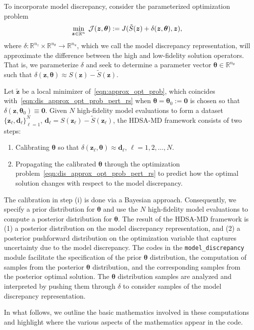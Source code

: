 \documentclass[11pt]{article}
\renewcommand{\vec}[1] {\boldsymbol{#1}}
\newcommand{\R}{\mathbb{R}}
\renewcommand{\t}{\bm{\theta}}
\newcommand{\z}{\bm{z}}
\newcommand{\0}{\bm{0}}
\renewcommand{\d}{\delta}
\begin{document}
To incorporate model discrepancy, consider the parameterized optimization problem
\begin{align}
\label{eqn:dis_approx_opt_prob_pert_rs}
 \min_{\z \in \R^n} \hspace{1 mm} \mathcal{J}(\z,\t):=J(\tilde{S}(\z)+\d(\z,\t),\z) ,
\end{align}
where $\d:\R^{n_z} \times \R^{n_\theta} \to \R^{n_u}$, which we call the model discrepancy representation, will approximate the difference between the high and low-fidelity solution operators. That is, we parameterize $\d$ and seek to determine a parameter vector $\t \in \R^{n_\theta}$ such that $\d(\z,\t) \approx S(\z)-\tilde{S}(\z)$. 

Let $\tilde{\z}$ be a local minimizer of~\eqref{eqn:approx_opt_prob}, which coincides with~\eqref{eqn:dis_approx_opt_prob_pert_rs} when $\t=\t_0 := \vec{0}$ is chosen so that $\d(\z,\t_0) \equiv \vec{0}$. Given $N$ high-fidelity model evaluations to form a dataset $\{ \z_\ell, \vec{d}_\ell \}_{\ell=1}^N$, $\vec{d}_\ell=S(\z_\ell)-\tilde{S}(\z_\ell)$, the HDSA-MD framework consists of two steps:
\begin{enumerate}
\item[(i)] Calibrating $\t$ so that $\d(\z_\ell,\t) \approx \vec{d}_\ell$, $\ell=1,2,\dots,N$.
\item[(ii)] Propagating the calibrated $\t$ through the optimization problem~\eqref{eqn:dis_approx_opt_prob_pert_rs} to predict how the optimal solution changes with respect to the model discrepancy.
\end{enumerate}
The calibration in step (i) is done via a Bayesian approach. Consequently, we specify a prior distribution for $\t$ and use the $N$ high-fidelity model evaluations to compute a posterior distribution for $\t$. The result of the HDSA-MD framework is (1) a posterior distribution on the model discrepancy representation, and (2) a posterior pushforward distribution on the optimization variable that captures uncertainty due to the model discrepancy. The codes in the \texttt{model\_discrepancy} module facilitate the specification of the prior $\t$ distribution, the computation of samples from the posterior $\t$ distribution, and the corresponding samples from the posterior optimal solution. The $\t$ distribution samples are analyzed and interpreted by pushing them through $\d$ to consider samples of the model discrepancy representation. 

In what follows, we outline the basic mathematics involved in these computations and highlight where the various aspects of the mathematics appear in the code.
\end{document}
